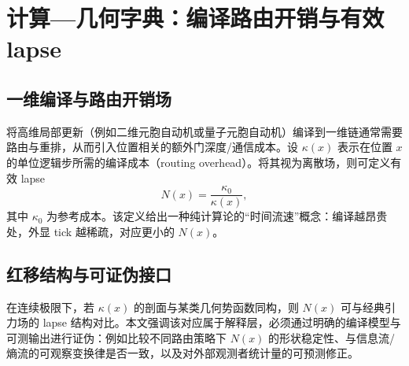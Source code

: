 \section{计算—几何字典：编译路由开销与有效 lapse}

\subsection{一维编译与路由开销场}

将高维局部更新（例如二维元胞自动机或量子元胞自动机）编译到一维链通常需要路由与重排，从而引入位置相关的额外门深度/通信成本。设 $\kappa(x)$ 表示在位置 $x$ 的单位逻辑步所需的编译成本（routing overhead）。将其视为离散场，则可定义有效 lapse
\[
N(x)=\frac{\kappa_0}{\kappa(x)},
\]
其中 $\kappa_0$ 为参考成本。该定义给出一种纯计算论的“时间流速”概念：编译越昂贵处，外显 tick 越稀疏，对应更小的 $N(x)$。

\subsection{红移结构与可证伪接口}

在连续极限下，若 $\kappa(x)$ 的剖面与某类几何势函数同构，则 $N(x)$ 可与经典引力场的 lapse 结构对比。本文强调该对应属于解释层，必须通过明确的编译模型与可测输出进行证伪：例如比较不同路由策略下 $N(x)$ 的形状稳定性、与信息流/熵流的可观察变换律是否一致，以及对外部观测者统计量的可预测修正。

